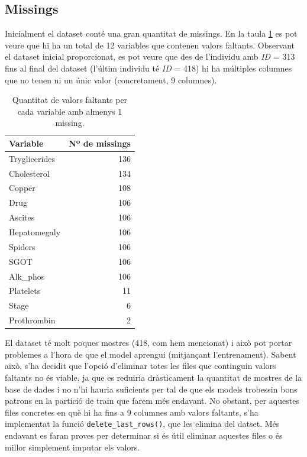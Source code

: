 \subsection{Missings}
Inicialment el dataset conté una gran quantitat de missings. En la taula \ref{tab:missings} es pot veure que hi ha un total de 12 variables que contenen valors faltants. Observant el dataset inicial proporcionat, es pot veure que des de l'individu amb \textit{ID} = 313 fins al final del dataset (l'últim individu té \textit{ID} = 418) hi ha múltiples columnes que no tenen ni un únic valor (concretament, 9 columnes).

\begin{table}[H]
\centering
\begin{tabular}{lr}
\hline
\textbf{Variable} & \textbf{Nº de missings} \\
\hline
Tryglicerides & 136 \\
Cholesterol & 134 \\
Copper & 108 \\
Drug & 106 \\
Ascites & 106 \\
Hepatomegaly & 106 \\
Spiders & 106 \\
SGOT & 106 \\
Alk\_phos & 106 \\
Platelets & 11 \\
Stage & 6 \\
Prothrombin & 2 \\
\hline
\end{tabular}
\caption{Quantitat de valors faltants per cada variable amb almenys 1 missing.}
\label{tab:missings}
\end{table}

El dataset té molt poques mostres (418, com hem mencionat) i això pot portar problemes a l'hora de que el model aprengui (mitjançant l'entrenament). Sabent això, s'ha decidit que l'opció d'eliminar totes les files que continguin valors faltants no és viable, ja que es reduiria dràsticament la quantitat de mostres de la base de dades i no n'hi hauria suficients per tal de que els models trobessin bons patrons en la partició de train que farem més endavant. No obstant, per aquestes files concretes en què hi ha fins a 9 columnes amb valors faltants, s'ha implementat la funció \texttt{delete\_last\_rows()}, que les elimina del datset. Més endavant es faran proves per determinar si és útil eliminar aquestes files o és millor simplement imputar els valors.

